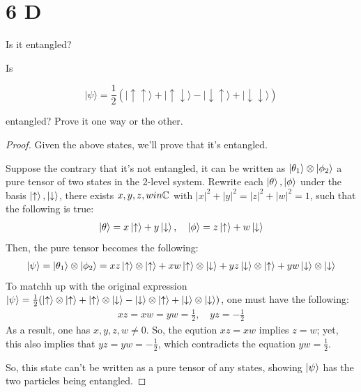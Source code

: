 \documentclass{article}
\begin{document}
\newpage

\section*{6 D}
\begin{ques}\label{q6}
Is it entangled?

Is

\[
|\psi\rangle = \frac{1}{2} \left( |\uparrow\uparrow\rangle + |\uparrow\downarrow\rangle - |\downarrow\uparrow\rangle + |\downarrow\downarrow\rangle \right)
\]

entangled? Prove it one way or the other.
\end{ques}

\begin{proof}
    Given the above states, we'll prove that it's entangled. 

    \hfil
    
    Suppose the contrary that it's not entangled, it can be written as $\ket{\theta_1}\otimes\ket{\phi_2}$ a pure tensor of two states in the 2-level system. Rewrite each $\ket{\theta},\ket{\phi}$ under the basis $\ket{\uparrow},\ket{\downarrow}$, there exists $x,y,z,w in \mathbb{C}$ with $|x|^2+|y|^2=|z|^2+|w|^2=1$, such that the following is true:
    \begin{align}
        \ket{\theta} = x\ket{\uparrow}+y\ket{\downarrow},\quad \ket{\phi}=z\ket{\uparrow}+w\ket{\downarrow}
    \end{align}
    Then, the pure tensor becomes the following:
    \begin{align}
        \ket{\psi} = \ket{\theta_1}\otimes\ket{\phi_2} = xz\ket{\uparrow}\otimes\ket{\uparrow}+xw\ket{\uparrow}\otimes\ket{\downarrow}+yz\ket{\downarrow}\otimes\ket{\uparrow}+yw\ket{\downarrow}\otimes\ket{\downarrow}
    \end{align}
    To matchh up with the original expression $\ket{\psi}=\frac{1}{2}(\ket{\uparrow}\otimes\ket{\uparrow}+\ket{\uparrow}\otimes\ket{\downarrow}-\ket{\downarrow}\otimes\ket{\uparrow}+\ket{\downarrow}\otimes\ket{\downarrow})$, one must have the following:
    \begin{align}
        xz = xw = yw = \frac{1}{2},\quad yz = -\frac{1}{2}
    \end{align}
    As a result, one has $x,y,z,w\neq 0$. So, the eqution $xz = xw$ implies $z=w$; yet, this also implies that $yz = yw = -\frac{1}{2}$, which contradicts the equation $yw = \frac{1}{2}$.

    So, this state can't be written as a pure tensor of any states, showing $\ket{\psi}$ has the two particles being entangled.
\end{proof}
\end{document}
